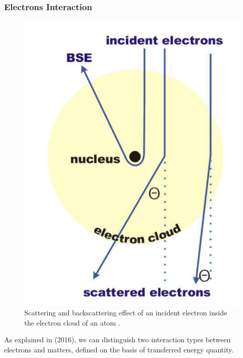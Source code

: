 \subsubsection{Electrons Interaction}
\label{sssec:electroninteractions}
\begin{figure}
    \centering
    \includegraphics[scale=0.35]{Images/electrons.png}
    \caption[Scattering and backscattering of an electron.]{Scattering and backscattering effect of an incident electron inside the electron cloud of an atom \cite{krumeich_properties_2015}.}
    \label{fig:electronsscattering}
\end{figure}
As explained in \citeauthor{korner_additive_2016} (2016), we can distinguish two interaction types between electrons and matters, defined on the basis of transferred energy quantity. 
